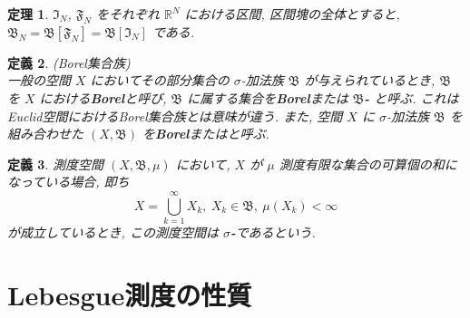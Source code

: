 \documentclass[dvipdfmx]{jsreport}
\newtheorem{theo}{定理}[section]
\newtheorem{defi}[theo]{定義}
\begin{document}
\begin{theo}
    $\mathfrak{I}_N$, $\mathfrak{F}_N$ をそれぞれ $\mathbb{R}^N$ における区間, 区間塊の全体とすると, $\mathfrak{B}_N = \mathfrak{B}[\mathfrak{F}_N] = \mathfrak{B}[\mathfrak{I}_N]$ である. 
\end{theo}

\begin{defi}
    (Borel集合族) \\
    一般の空間 $X$ においてその部分集合の $\sigma$-加法族 $\mathfrak{B}$ が与えられているとき, $\mathfrak{B}$ を $X$ における{\bf Borel}と呼び, $\mathfrak{B}$ に属する集合を{\bf Borel}または {\bf $\mathfrak{B}$-} と呼ぶ. 
    これはEuclid空間におけるBorel集合族とは意味が違う. また, 空間 $X$ に $\sigma$-加法族 $\mathfrak{B}$ を組み合わせた $(X, \mathfrak{B})$ を{\bf Borel}またはと呼ぶ. 
\end{defi}

\begin{defi}
    測度空間 $(X, \mathfrak{B}, \mu)$ において, $X$ が $\mu$ 測度有限な集合の可算個の和になっている場合, 即ち
    \begin{equation}
        X = \bigcup_{k = 1}^\infty X_k, \ X_k \in \mathfrak{B}, \ \mu(X_k) < \infty
    \end{equation}
    が成立しているとき, この測度空間は {\bf $\sigma$-}であるという. 
\end{defi}

\section{Lebesgue測度の性質}
\end{document}
